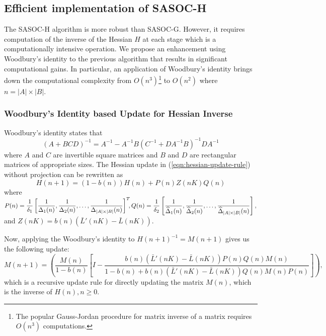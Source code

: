 \documentclass[11pt,letterpaper,english]{article}
\begin{document}
\vspace{4pt}



\subsection{Efficient implementation of SASOC-H}
\label{sec:sasoc-w}

The SASOC-H algorithm is more robust than SASOC-G. However, it requires computation of the inverse of the Hessian $H$ at each stage which is a computationally intensive operation. We propose an enhancement using Woodbury's identity to the previous algorithm that results in significant computational gains. In particular, an application of Woodbury's identity brings down the computational complexity from $O(n^3)$\footnote{The popular 
Gauss-Jordan procedure for matrix inverse of a matrix requires $O(n^3)$ computations.} 
to $O(n^2)$ where $n = |A| \times |B|$.

\subsubsection{Woodbury's Identity based Update for Hessian Inverse}
  Woodbury's identity states that \[(A + BCD)^{-1} = A^{-1} - A^{-1} B \left ( C^{-1} + D A^{-1} B \right )^{-1} D A^{-1}\] where $A$ and $C$ are invertible square matrices and $B$ and $D$ are rectangular matrices of appropriate sizes. The Hessian update in (\ref{eqn:hessian-update-rule}) without projection can be rewritten as
\[H(n + 1) = (1 - b(n)) H(n) +  P(n) Z(nK) Q(n)\]
where \\
$P(n) = \dfrac{1}{\delta_1} \left [ \dfrac{1}{\Delta_1(n)},\dfrac{1}{\Delta_2(n)}, \ldots ,\dfrac{1}{\Delta_{|A| \times |B|}(n)} \right ]^T \kern-1ex, Q(n) = \dfrac{1}{\delta_2} \left [ \dfrac{1}{\widehat\Delta_1(n)}, \dfrac{1}{\widehat\Delta_2(n)}, \ldots ,\dfrac{1}{\widehat\Delta_{|A| \times |B|}(n)} \right ],$ and $Z(nK) = b(n) \left (\bar{L}'(nK) - \bar{L}(nK) \right )$.

Now, applying the Woodbury's identity to $H(n + 1)^{-1} = M(n + 1)$ gives us the following
update:
\[M(n + 1) = \left (\dfrac{M(n)}{1 - b(n)} \left [ I - \dfrac{b(n) \left ( \bar{L}'(nK) - \bar{L}(nK) \right ) P(n) Q(n) M(n)}{1 - b(n) + b(n) \left ( \bar{L}'(nK) - \bar{L}(nK) \right ) Q(n) M(n) P(n) } \right ] \right ),\] which is a recursive update rule for directly updating the matrix $M(n)$, which is the inverse of $H(n), n \ge 0$.
\end{document}
